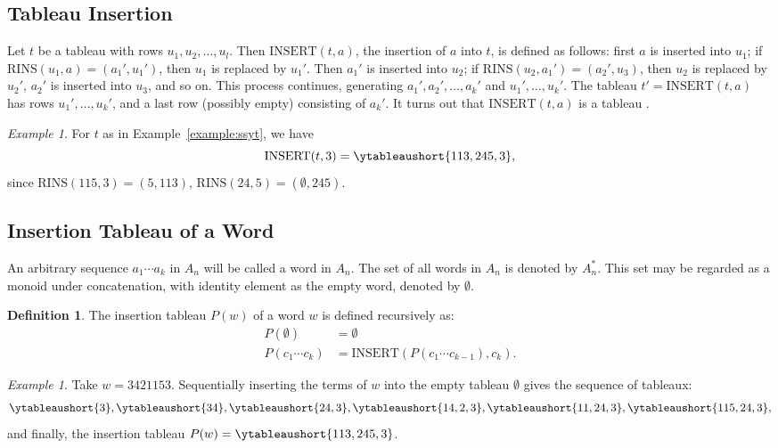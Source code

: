 \documentclass[10pt]{amsproc}
\theoremstyle{definition}
\newtheorem{definition}[theorem]{Definition}
\theoremstyle{remark}
\newtheorem{example}[theorem]{Example}
\newcommand{\rowins}{\mathrm{RINS}}
\newcommand{\ins}{\mathrm{INSERT}}
\begin{document}
\subsection{Tableau Insertion}
\label{sec:tableau-insertion}
Let $t$ be a tableau with rows $u_1,u_2,\dotsc, u_l$.
Then $\ins(t,a)$, the insertion of $a$ into $t$, is defined as follows: first $a$ is inserted into $u_1$; if $\rowins(u_1,a)=(a_1',u_1')$, then $u_1$ is replaced by $u_1'$.
Then $a_1'$ is inserted into $u_2$; if $\rowins(u_2,a_1')=(a_2',u_3)$, then $u_2$ is replaced by $u_2'$, $a_2'$ is inserted into $u_3$, and so on.
This process continues, generating $a_1',a_2',\dotsc,a_k'$ and $u_1',\dotsc,u_k'$.
The tableau $t'=\ins(t,a)$ has rows $u_1',\dotsc,u_k'$, and a last row (possibly empty) consisting of $a_k'$.
It turns out that $\ins(t,a)$ is a tableau \cite{knuth}.
\begin{example}
  \label{example:insertion}
  For $t$ as in Example~\ref{example:ssyt}, we have
  \begin{displaymath}
    \ins(t,3) = \ytableaushort{113,245,3},
  \end{displaymath}
  since $\rowins(115,3)=(5,113)$, $\rowins(24,5)=(\emptyset,245)$.
\end{example}
\subsection{Insertion Tableau of a Word}
\label{sec:insert-tabl-word}
An arbitrary sequence $a_1\dotsb a_k$ in $A_n$ will be called a word in $A_n$.
The set of all words in $A_n$ is denoted by $A_n^*$.
This set may be regarded as a monoid under concatenation, with identity element as the empty word, denoted by $\emptyset$.
\begin{definition}
\label{definition:insertion-tableau}
The insertion tableau $P(w)$ of a word $w$ is defined recursively as:
\begin{align}
  P(\emptyset)&=\emptyset\\
  P(c_1\dotsb c_k)&=\ins(P(c_1\dotsb c_{k-1}), c_k).
\end{align}
\end{definition}
\begin{example}
  \label{example:insertion-tableau}
  Take $w=3421153$.
  Sequentially inserting the terms of $w$ into the empty tableau $\emptyset$ gives the sequence of tableaux:
  \begin{displaymath}
    \ytableaushort{3},\ytableaushort{34},\ytableaushort{24,3},\ytableaushort{14,2,3},\ytableaushort{11,24,3},\ytableaushort{115,24,3},
  \end{displaymath}
  and finally, the insertion tableau $P(w)=\ytableaushort{113,245,3}$.
\end{example}
\end{document}
